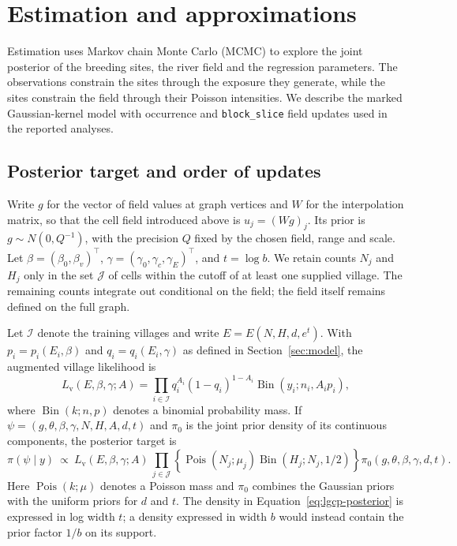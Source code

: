 \section{Estimation and approximations}

Estimation uses Markov chain Monte Carlo (MCMC) to explore the joint posterior of the breeding sites, the river field and the regression parameters. The observations constrain the sites through the exposure they generate, while the sites constrain the field through their Poisson intensities. We describe the marked Gaussian-kernel model with occurrence and \texttt{block\_slice} field updates used in the reported analyses.

\subsection{Posterior target and order of updates}

Write $g$ for the vector of field values at graph vertices and $W$ for the interpolation matrix, so that the cell field introduced above is $u_j=(Wg)_j$. Its prior is $g\sim N(0,Q^{-1})$, with the precision $Q$ fixed by the chosen field, range and scale. Let $\beta=(\beta_0,\beta_v)^\top$, $\gamma=(\gamma_0,\gamma_c,\gamma_E)^\top$, and $t=\log b$. We retain counts $N_j$ and $H_j$ only in the set $\mathcal J$ of cells within the cutoff of at least one supplied village. The remaining counts integrate out conditional on the field; the field itself remains defined on the full graph.

Let $\mathcal I$ denote the training villages and write $E=E(N,H,d,e^t)$. With $p_i=p_i(E_i,\beta)$ and $q_i=q_i(E_i,\gamma)$ as defined in Section~\ref{sec:model}, the augmented village likelihood is
\begin{equation}\label{eq:augmented-village}
 L_{\mathrm v}(E,\beta,\gamma;A)
 =\prod_{i\in\mathcal I}
 q_i^{A_i}(1-q_i)^{1-A_i}
 \operatorname{Bin}(y_i;n_i,A_i p_i),
\end{equation}
where $\operatorname{Bin}(k;n,p)$ denotes a binomial probability mass. If $\psi=(g,\theta,\beta,\gamma,N,H,A,d,t)$ and $\pi_0$ is the joint prior density of its continuous components, the posterior target is
\begin{equation}\label{eq:lgcp-posterior}
 \pi(\psi\mid y)\ \propto\
 L_{\mathrm v}(E,\beta,\gamma;A)\,
 \prod_{j\in\mathcal J}
 \left\{\operatorname{Pois}(N_j;\mu_j)
        \operatorname{Bin}(H_j;N_j,1/2)\right\}
 \pi_0(g,\theta,\beta,\gamma,d,t).
\end{equation}
Here $\operatorname{Pois}(k;\mu)$ denotes a Poisson mass and $\pi_0$ combines the Gaussian priors with the uniform priors for $d$ and $t$. The density in Equation~\eqref{eq:lgcp-posterior} is expressed in log width $t$; a density expressed in width $b$ would instead contain the prior factor $1/b$ on its support.

